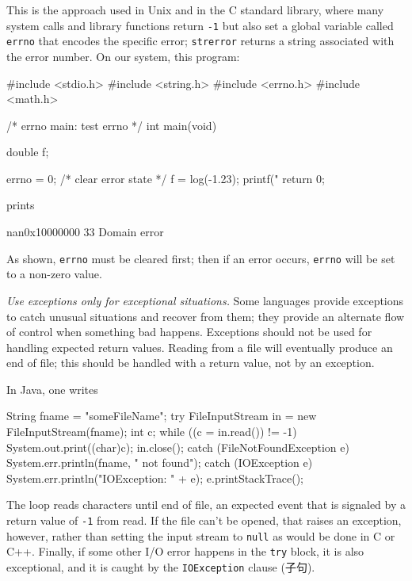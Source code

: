 This is the approach used in Unix and in the C standard library, where many
system calls and library functions return \verb'-1' but also set a global
variable called \verb'errno' that encodes the specific error;
\verb'strerror' returns a string associated with the error number. On our
system, this program:
\begin{wellcode}
    #include <stdio.h>
    #include <string.h>
    #include <errno.h>
    #include <math.h>

    /* errno main: test errno */
    int main(void)
    {
        double  f;

        errno = 0;  /* clear error state */
        f = log(-1.23);
        printf("%
        return 0;
    }
\end{wellcode}
prints
\begin{wellcode}
    nan0x10000000 33 Domain error
\end{wellcode}
As shown, \verb'errno' must be cleared first; then if an error occurs,
\verb'errno' will be set to a non-zero value.

\emph{Use exceptions only for exceptional situations.} Some languages
provide exceptions to catch unusual situations and recover from them; they
provide an alternate flow of control when something bad happens. Exceptions
should not be used for handling expected return values. Reading from a file
will eventually produce an end of file; this should be handled with a
return value, not by an exception.

In Java, one writes
\begin{wellcode}
    String fname = "someFileName";
    try {
        FileInputStream in = new FileInputStream(fname);
        int c;
        while ((c = in.read()) != -1)
            System.out.print((char)c);
        in.close();
    } catch (FileNotFoundException e) {
        System.err.println(fname, " not found");
    } catch (IOException e) {
        System.err.println("IOException: " + e);
        e.printStackTrace();
    }
\end{wellcode}

The loop reads characters until end of file, an expected event that is
signaled by a return value of \verb'-1' from read. If the file can't be
opened, that raises an exception, however, rather than setting the input
stream to \verb'null' as would be done in C or C++.  Finally, if some other
I/O error happens in the \verb'try' block, it is also exceptional, and it
is caught by the \verb'IOException' clause (子句).

